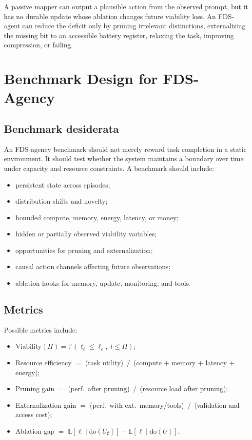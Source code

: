 \documentclass[10pt,a4paper,twocolumn,aps,prl]{revtex4-2}
\newcommand{\E}{\mathbb{E}}
\newcommand{\Prob}{\mathbb{P}}
\newcommand{\doop}{\mathrm{do}}
\begin{document}
A passive mapper can output a plausible action from the observed prompt, but it has no durable update whose ablation changes future viability loss. An FDS-agent can reduce the deficit only by pruning irrelevant distinctions, externalizing the missing bit to an accessible battery register, relaxing the task, improving compression, or failing.

\section{Benchmark Design for FDS-Agency}

\subsection{Benchmark desiderata}

An FDS-agency benchmark should not merely reward task completion in a static environment. It should test whether the system maintains a boundary over time under capacity and resource constraints. A benchmark should include:
\begin{itemize}[leftmargin=2em]
    \item persistent state across episodes;
    \item distribution shifts and novelty;
    \item bounded compute, memory, energy, latency, or money;
    \item hidden or partially observed viability variables;
    \item opportunities for pruning and externalization;
    \item causal action channels affecting future observations;
    \item ablation hooks for memory, update, monitoring, and tools.
\end{itemize}

\subsection{Metrics}

Possible metrics include:
\begin{itemize}[leftmargin=2em]
    \item Viability$(H)=\Prob(\ell_t\leq \ell_c,\;t\leq H)$;
    \item Resource efficiency $=$ (task utility)~$/$~(compute $+$ memory $+$ latency $+$ energy);
    \item Pruning gain $=$ (perf.\ after pruning)~$/$~(resource load after pruning);
    \item Externalization gain $=$ (perf.\ with ext.\ memory/tools)~$/$~(validation and access cost);
    \item Ablation gap $=$ $\E[\ell\mid\doop(U_\emptyset)]-\E[\ell\mid\doop(U)]$.
\end{itemize}
\end{document}
